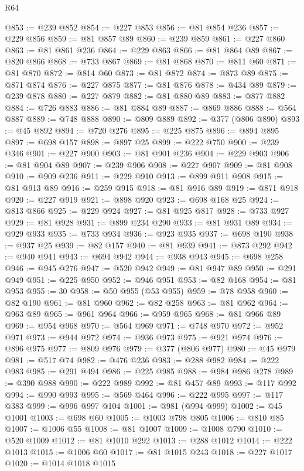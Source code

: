 \begin{lexlean}{R64}
\begin{coremodule}
@853 := @239 @852
@854 := @227 @853
@856 := @81 @854 @236
@857 := @229 @856
@859 := @81 @857 @89
@860 := @239 @859
@861 := @227 @860
@863 := @81 @861 @236
@864 := @229 @863
@866 := @81 @864 @89
@867 := @820 @866
@868 := @733 @867
@869 := @81 @868
@870 := @811 @60
@871 := @81 @870
@872 := @814 @60
@873 := @81 @872
@874 := @873 @89
@875 := @871 @874
@876 := @227 @875
@877 := @81 @876
@878 := @434 @89
@879 := @239 @878
@880 := @227 @879
@882 := @81 @880 @89
@883 := @877 @882
@884 := @726 @883
@886 := @81 @884 @89
@887 := @869 @886
@888 := @564 @887
@889 := @748 @888
@890 := @809 @889
@892 := @377 (@806 @890)
@893 := @45 @892
@894 := @720 @276
@895 := @225 @875
@896 := @894 @895
@897 := @698 @157
@898 := @897 @25
@899 := @222 @750
@900 := @239 @346
@901 := @227 @900
@903 := @81 @901 @236
@904 := @229 @903
@906 := @81 @904 @89
@907 := @239 @906
@908 := @227 @907
@909 := @81 @908
@910 := @909 @236
@911 := @229 @910
@913 := @899 @911 @908
@915 := @81 @913 @89
@916 := @259 @915
@918 := @81 @916 @89
@919 := @871 @918
@920 := @227 @919
@921 := @898 @920
@923 := @698 @168 @25
@924 := @813 @866
@925 := @229 @924
@927 := @81 @925 @817
@928 := @733 @927
@929 := @81 @928
@931 := @899 @234 @290
@933 := @81 @931 @89
@934 := @929 @933
@935 := @733 @934
@936 := @923 @935
@937 := @698 @190
@938 := @937 @25
@939 := @82 @157
@940 := @81 @939
@941 := @873 @292
@942 := @940 @941
@943 := @694 @942
@944 := @938 @943
@945 := @698 @258
@946 := @945 @276
@947 := @520 @942
@949 := @81 @947 @89
@950 := @291 @949
@951 := @225 @950
@952 := @946 @951
@953 := @82 @168
@954 := @81 @953
@955 := 30
@958 := @50 @955 (@53 @955)
@959 := @78 @958
@960 := @82 @190
@961 := @81 @960
@962 := @82 @258
@963 := @81 @962
@964 := @963 @89
@965 := @961 @964
@966 := @959 @965
@968 := @81 @966 @89
@969 := @954 @968
@970 := @564 @969
@971 := @748 @970
@972 := @952 @971
@973 := @944 @972
@974 := @936 @973
@975 := @921 @974
@976 := @896 @975
@977 := @809 @976
@979 := @377 (@806 @977)
@980 := @45 @979
@981 := @517 @74
@982 := @476 @236
@983 := @288 @982
@984 := @222 @983
@985 := @291 @494
@986 := @225 @985
@988 := @984 @986 @278
@989 := @390 @988
@990 := @222 @989
@992 := @81 @457 @89
@993 := @117 @992
@994 := @990 @993
@995 := @569 @464
@996 := @222 @995
@997 := @117 @383
@999 := @996 @997 @104
@1001 := @981 (@994 @999)
@1002 := @45 @1001
@1003 := @698 @60
@1005 := @1003 @798 @805
@1006 := @810 @85
@1007 := @1006 @55
@1008 := @81 @1007
@1009 := @1008 @790
@1010 := @520 @1009
@1012 := @81 @1010 @292
@1013 := @288 @1012
@1014 := @222 @1013
@1015 := @1006 @60
@1017 := @81 @1015 @243
@1018 := @227 @1017
@1020 := @1014 @1018 @1015

\end{coremodule}
\end{lexlean}
